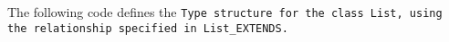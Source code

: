 The following code defines the \tt{Type} structure for the class \tt{List},
using the relationship specified in \tt{List_EXTENDS}.

